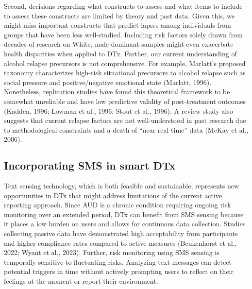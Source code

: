 \documentclass[
  letterpaper,
  DIV=11,
  numbers=noendperiod]{scrartcl}
\begin{document}
Second, decisions regarding what constructs to assess and what items to
include to assess these constructs are limited by theory and past data.
Given this, we might miss important constructs that predict lapses among
individuals from groups that have been less well-studied. Including risk
factors solely drawn from decades of research on White, male-dominant
samples might even exacerbate health disparities when applied to DTx.
Further, our current understanding of alcohol relapse precursors is not
comprehensive. For example, Marlatt's proposed taxonomy characterizes
high-risk situational precursors to alcohol relapse such as social
pressure and positive/negative emotional state (Marlatt, 1996).
Nonetheless, replication studies have found this theoretical framework
to be somewhat unreliable and have low predictive validity of
post-treatment outcomes (Kadden, 1996; Lowman et al., 1996; Stout et
al., 1996). A review study also suggests that current relapse factors
are not well-understood in past research due to methodological
constraints and a death of ``near real-time'' data (McKay et al., 2006).

\subsection{Incorporating SMS in smart
DTx}\label{incorporating-sms-in-smart-dtx}

Text sensing technology, which is both feasible and sustainable,
represents new opportunities in DTx that might address limitations of
the current active reporting approach. Since AUD is a chronic condition
requiring ongoing risk monitoring over an extended period, DTx can
benefit from SMS sensing because it places a low burden on users and
allows for continuous data collection. Studies collecting passive data
have demonstrated high acceptability from participants and higher
compliance rates compared to active measures (Beukenhorst et al., 2022;
Wyant et al., 2023). Further, risk monitoring using SMS sensing is
temporally sensitive to fluctuating risks. Analyzing text messages can
detect potential triggers in time without actively prompting users to
reflect on their feelings at the moment or report their environment.
\end{document}
